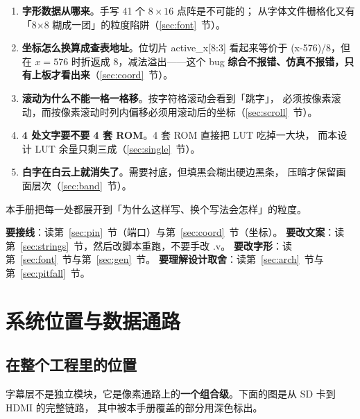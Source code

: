 \documentclass[10pt,a4paper]{article}
\newcommand{\sig}[1]{{\ttfamily\small #1}}
\newcommand{\reg}[1]{{\ttfamily #1}}
\newcommand{\code}[1]{{\ttfamily\small #1}}
\begin{document}
\begin{enumerate}[label=\textbf{\arabic*.},leftmargin=2em]
\item \textbf{字形数据从哪来}。手写 41 个 $8\times16$ 点阵是不可能的；
      从字体文件栅格化又有「8×8 糊成一团」的粒度陷阱（\ref{sec:font}~节）。
\item \textbf{坐标怎么换算成查表地址}。位切片 \reg{active\_x[8:3]} 看起来等价于
      \code{(x-576)/8}，但在 $x=576$ 时折返成 8，减法溢出——这个 bug
      \textbf{综合不报错、仿真不报错，只有上板才看出来}（\ref{sec:coord}~节）。
\item \textbf{滚动为什么不能一格一格移}。按字符格滚动会看到「跳字」，
      必须按像素滚动，而按像素滚动时列内偏移必须用滚动后的坐标（\ref{sec:scroll}~节）。
\item \textbf{4 处文字要不要 4 套 ROM}。4 套 ROM 直接把 LUT 吃掉一大块，
      而本设计 LUT 余量只剩三成（\ref{sec:single}~节）。
\item \textbf{白字在白云上就消失了}。需要衬底，但填黑会糊出硬边黑条，
      压暗才保留画面层次（\ref{sec:band}~节）。
\end{enumerate}

本手册把每一处都展开到「为什么这样写、换个写法会怎样」的粒度。

\begin{dsnote}[读法建议]
\textbf{要接线}：读第~\ref{sec:pin}~节（端口）与第~\ref{sec:coord}~节（坐标）。
\textbf{要改文案}：读第~\ref{sec:strings}~节，然后改脚本重跑，不要手改 \sig{.v}。
\textbf{要改字形}：读第~\ref{sec:font}~节与第~\ref{sec:gen}~节。
\textbf{要理解设计取舍}：读第~\ref{sec:arch}~节与第~\ref{sec:pitfall}~节。
\end{dsnote}

\section{系统位置与数据通路}

\subsection{在整个工程里的位置}

字幕层不是独立模块，它是像素通路上的\textbf{一个组合级}。下面的图是从 SD 卡到 HDMI 的完整链路，
其中被本手册覆盖的部分用深色标出。
\end{document}
